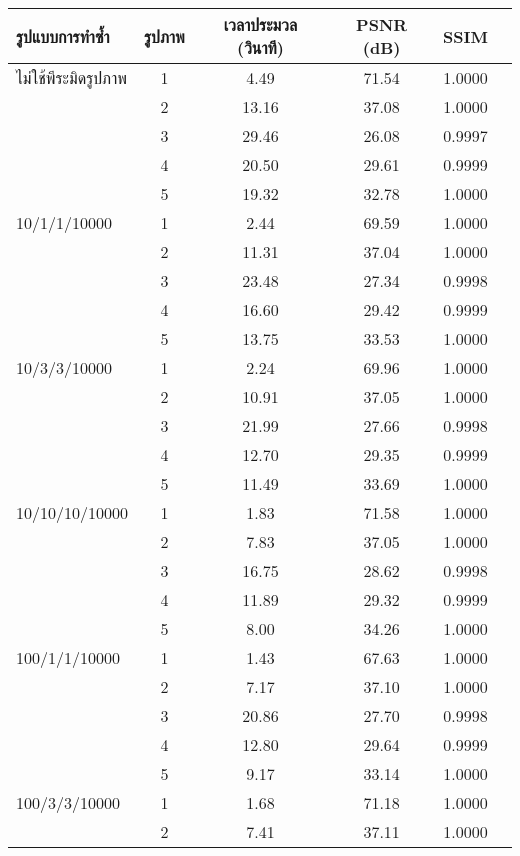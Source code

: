 \begin{table}[H]
    \footnotesize
    \centering
    \begin{tabular}[ht]{|l|c|c|c|c|c|}
        \hline
        รูปแบบการทำซ้ำ  & รูปภาพ &เวลาประมวล  (วินาที) & PSNR (dB) & SSIM \\
        \hline
        ไม่ใช้พีระมิดรูปภาพ & 1 & 4.49  & 71.54 & 1.0000 \\ 
        & 2 & 13.16 & 37.08 & 1.0000 \\
        & 3 & 29.46 & 26.08 & 0.9997 \\
        & 4 & 20.50 & 29.61 & 0.9999 \\
        & 5 & 19.32 & 32.78 & 1.0000 \\
        \hline
        10/1/1/10000 & 1 & 2.44 & 69.59& 1.0000 \\
        & 2 & 11.31 &37.04 & 1.0000 \\
        & 3 & 23.48 & 27.34 & 0.9998 \\
        & 4 & 16.60 & 29.42 & 0.9999 \\
        & 5 & 13.75 & 33.53 & 1.0000 \\
        \hline
        10/3/3/10000  & 1 & 2.24 & 69.96 & 1.0000\\
        & 2 & 10.91 & 37.05 & 1.0000 \\
        & 3 & 21.99 & 27.66 & 0.9998 \\
        & 4 & 12.70 & 29.35 & 0.9999 \\
        & 5 & 11.49 & 33.69 & 1.0000\\
        \hline
        10/10/10/10000  & 1 & 1.83 & 71.58 & 1.0000 \\
        & 2 & 7.83 & 37.05 & 1.0000 \\
        & 3 & 16.75 & 28.62 & 0.9998 \\
        & 4 & 11.89 & 29.32 & 0.9999 \\
        & 5 & 8.00 & 34.26 & 1.0000 \\
        \hline
        100/1/1/10000  & 1 & 1.43 & 67.63 & 1.0000\\
        & 2 & 7.17 & 37.10 & 1.0000 \\
        & 3 & 20.86 & 27.70 & 0.9998 \\
        & 4 & 12.80 & 29.64 & 0.9999\\
        & 5 & 9.17 & 33.14 & 1.0000 \\
        \hline
        100/3/3/10000  & 1 & 1.68 & 71.18 & 1.0000 \\
        & 2 & 7.41 & 37.11 & 1.0000\\

\end{tabular}
\end{table}

